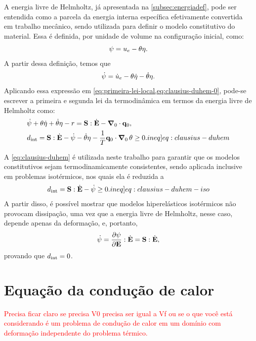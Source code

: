 \documentclass[Tese.tex]{subfiles}
\begin{document}
A energia livre de Helmholtz, já apresentada na \autoref{subsec:energiadef}, pode ser entendida como a parcela da energia interna específica efetivamente convertida em trabalho mecânico, sendo utilizada para definir o modelo constitutivo do material. Essa é definida, por unidade de volume na configuração inicial, como:
\begin{equation}\label{eq:helmholtz}
\psi = u_e - \theta\eta.
\end{equation}
A partir dessa definição, temos que
\begin{equation}\label{eq:dothelmholtz}
\dot{\psi} = \dot{u}_e- \theta \dot{\eta} - \dot{\theta} {\eta}.
\end{equation}
Aplicando essa expressão em \cref{eq:primeira-lei-local,eq:clausius-duhem-0}, pode-se escrever a primeira e segunda lei da termodinâmica em termos da energia livre de Helmholtz como:
\begin{align}
& \dothelmholtz + \temp \dotentropy + \dottemp {\entropy} - \calorInt = \S:\dotE - \gradientei\cdot\qi, \label{eq:primeira-lei-2} \\
&\dissipation = \S:\dotE - \dothelmholtz - \dottemp {\entropy} - \dfrac{1}{T}\qi\cdot\gradientei\,\temp \geq 0. \label[ineq]{eq:clausius-duhem}
\end{align}

A \cref{eq:clausius-duhem} é utilizada neste trabalho para garantir que os modelos constitutivos sejam termodinamicamente consistentes, sendo aplicada inclusive em problemas isotérmicos, nos quais ela é reduzida a
\begin{equation}
\dissipation = \S:\dotE - \dothelmholtz \geq 0. \label[ineq]{eq:clausius-duhem-iso}
\end{equation}
A partir disso, é possível mostrar que modelos hiperelásticos isotérmicos não provocam dissipação, uma vez que a energia livre de Helmholtz, nesse caso, depende apenas da deformação, e, portanto,
\begin{equation}
\dot{\psi} = \dfrac{\partial \psi}{\partial \mathbf{E}}:\dot{\mathbf{E}} = \mathbf{S}:\dot{\mathbf{E}},
\end{equation}
provando que $d_\text{int}=0$.

\section{Equação da condução de calor}\label{sec:conducao-calor-0}

\textcolor{red}{Precisa ficar claro se precisa V0 precisa ser igual a Vf ou se o que você está considerando é um problema de condução de calor em um domínio com deformação independente do problema térmico.}
\end{document}
